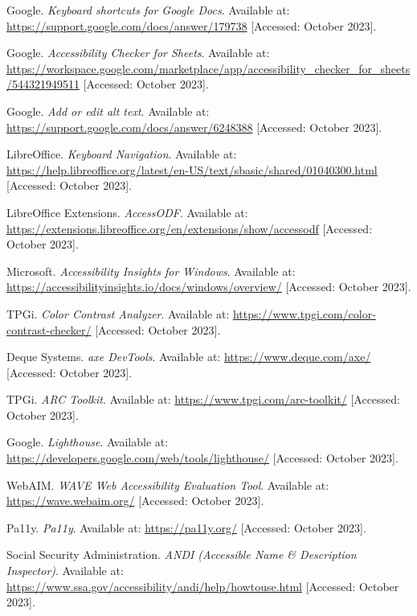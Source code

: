 \begin{thebibliography}{99}
 Google. \textit{Keyboard shortcuts for Google Docs}. Available at: \url{https://support.google.com/docs/answer/179738} [Accessed: October 2023].

 Google. \textit{Accessibility Checker for Sheets}. Available at: \url{https://workspace.google.com/marketplace/app/accessibility_checker_for_sheets/544321949511} [Accessed: October 2023].

 Google. \textit{Add or edit alt text}. Available at: \url{https://support.google.com/docs/answer/6248388} [Accessed: October 2023].

 LibreOffice. \textit{Keyboard Navigation}. Available at: \url{https://help.libreoffice.org/latest/en-US/text/sbasic/shared/01040300.html} [Accessed: October 2023].

 LibreOffice Extensions. \textit{AccessODF}. Available at: \url{https://extensions.libreoffice.org/en/extensions/show/accessodf} [Accessed: October 2023].

 Microsoft. \textit{Accessibility Insights for Windows}. Available at: \url{https://accessibilityinsights.io/docs/windows/overview/} [Accessed: October 2023].

 TPGi. \textit{Color Contrast Analyzer}. Available at: \url{https://www.tpgi.com/color-contrast-checker/} [Accessed: October 2023].

 Deque Systems. \textit{axe DevTools}. Available at: \url{https://www.deque.com/axe/} [Accessed: October 2023].

 TPGi. \textit{ARC Toolkit}. Available at: \url{https://www.tpgi.com/arc-toolkit/} [Accessed: October 2023].

 Google. \textit{Lighthouse}. Available at: \url{https://developers.google.com/web/tools/lighthouse/} [Accessed: October 2023].

 WebAIM. \textit{WAVE Web Accessibility Evaluation Tool}. Available at: \url{https://wave.webaim.org/} [Accessed: October 2023].

 Pa11y. \textit{Pa11y}. Available at: \url{https://pa11y.org/} [Accessed: October 2023].

 Social Security Administration. \textit{ANDI (Accessible Name \& Description Inspector)}. Available at: \url{https://www.ssa.gov/accessibility/andi/help/howtouse.html} [Accessed: October 2023].


\end{thebibliography}
